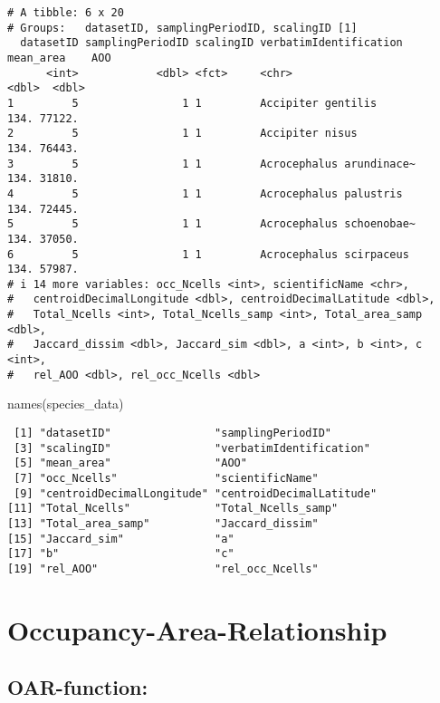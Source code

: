 \documentclass[
  letterpaper,
  DIV=11,
  numbers=noendperiod]{scrreprt}
\newenvironment{Shaded}{\begin{snugshade}}{\end{snugshade}}
\newcommand{\FunctionTok}[1]{\textcolor[rgb]{0.28,0.35,0.67}{#1}}
\newcommand{\NormalTok}[1]{\textcolor[rgb]{0.00,0.23,0.31}{#1}}
\begin{document}
\begin{verbatim}
# A tibble: 6 x 20
# Groups:   datasetID, samplingPeriodID, scalingID [1]
  datasetID samplingPeriodID scalingID verbatimIdentification   mean_area    AOO
      <int>            <dbl> <fct>     <chr>                        <dbl>  <dbl>
1         5                1 1         Accipiter gentilis            134. 77122.
2         5                1 1         Accipiter nisus               134. 76443.
3         5                1 1         Acrocephalus arundinace~      134. 31810.
4         5                1 1         Acrocephalus palustris        134. 72445.
5         5                1 1         Acrocephalus schoenobae~      134. 37050.
6         5                1 1         Acrocephalus scirpaceus       134. 57987.
# i 14 more variables: occ_Ncells <int>, scientificName <chr>,
#   centroidDecimalLongitude <dbl>, centroidDecimalLatitude <dbl>,
#   Total_Ncells <int>, Total_Ncells_samp <int>, Total_area_samp <dbl>,
#   Jaccard_dissim <dbl>, Jaccard_sim <dbl>, a <int>, b <int>, c <int>,
#   rel_AOO <dbl>, rel_occ_Ncells <dbl>
\end{verbatim}

\begin{Shaded}
\begin{Highlighting}[]
\FunctionTok{names}\NormalTok{(species\_data)}
\end{Highlighting}
\end{Shaded}

\begin{verbatim}
 [1] "datasetID"                "samplingPeriodID"
 [3] "scalingID"                "verbatimIdentification"
 [5] "mean_area"                "AOO"
 [7] "occ_Ncells"               "scientificName"
 [9] "centroidDecimalLongitude" "centroidDecimalLatitude"
[11] "Total_Ncells"             "Total_Ncells_samp"
[13] "Total_area_samp"          "Jaccard_dissim"
[15] "Jaccard_sim"              "a"
[17] "b"                        "c"
[19] "rel_AOO"                  "rel_occ_Ncells"
\end{verbatim}

\hypertarget{occupancy-area-relationship}{%
\section{Occupancy-Area-Relationship}\label{occupancy-area-relationship}}

\hypertarget{oar-function}{%
\subsection{OAR-function:}\label{oar-function}}
\end{document}

